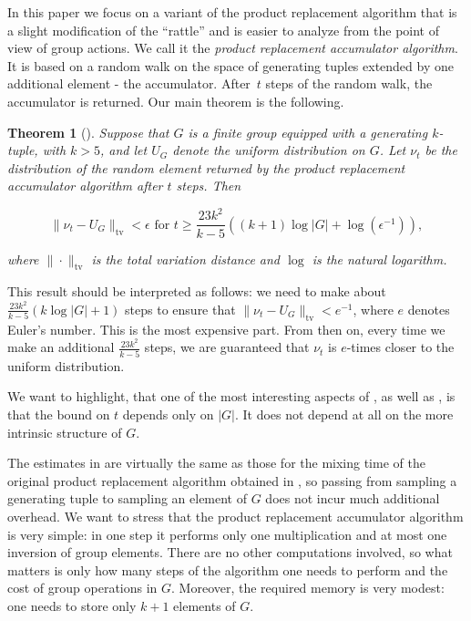\documentclass[12pt]{amsart}
\newtheorem*{theorem*}{Theorem}
\theoremstyle{definition}
\numberwithin{figure}{section}
\numberwithin{table}{section}
\numberwithin{equation}{section}
\begin{document}
In this paper we focus on a variant of the product replacement algorithm that is a slight modification of the ``rattle'' and is easier to analyze from the point of view of group actions. We call it the \textit{product replacement accumulator algorithm}. It is based on a random walk on the space of generating tuples extended by one additional element - the accumulator. After~$t$ steps of the random walk, the accumulator is returned. Our main theorem is the following.

\begin{theorem*}[]
Suppose that $G$ is a finite group equipped with a generating $k$-tuple, with $k>5$, and let $U_G$ denote the uniform distribution on $G$. Let $\nu_t$ be the distribution of the random element returned by the product replacement accumulator algorithm after $t$ steps. Then

$$
\|\nu_t - U_G\|_{\mathrm{tv}} < \epsilon \text{ for } t \geq \frac{23k^2}{k-5}((k+1)\log|G| + \log(\epsilon^{-1})),
$$

where $\|\!\cdot\!\|_{\mathrm{tv}}$ is the total variation distance and $\log$ is the natural logarithm. 
\end{theorem*}

This result should be interpreted as follows: we need to make about $\frac{23k^2}{k-5}(k\log|G| + 1)$ steps to ensure that $\|\nu_t - U_G\|_{\mathrm{tv}} < e^{-1}$, where $e$ denotes Euler’s number. This is the most expensive part. From then on, every time we make an additional $\frac{23k^2}{k-5}$ steps, we are guaranteed that $\nu_t$ is $e$-times closer to the uniform distribution. 

We want to highlight, that one of the most interesting aspects of , as well as \cite[Section 5.2]{MR4224715}, is that the bound on $t$ depends only on $|G|$. It does not depend at all on the more intrinsic structure of $G$.

The estimates in  are virtually the same as those for the mixing time of the original product replacement algorithm obtained in \cite{MR4224715}, so passing from sampling a generating tuple to sampling an element of $G$ does not incur much additional overhead. We want to stress that the product replacement accumulator algorithm is very simple: in one step it performs only one multiplication and at most one inversion of group elements. There are no other computations involved, so what matters is only how many steps of the algorithm one needs to perform and the cost of group operations in $G$. Moreover, the required memory is very modest: one needs to store only $k+1$ elements of $G$.
\end{document}
